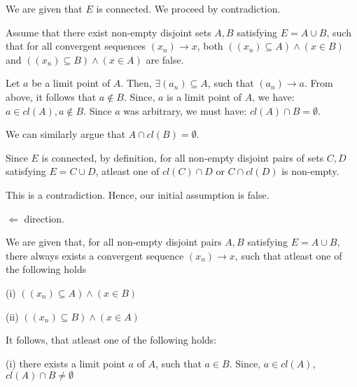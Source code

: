 \documentclass[10pt]{article}
\begin{document}
We are given that $\displaystyle E$ is connected. We proceed by contradiction.



Assume that there exist non-empty disjoint sets $\displaystyle A,B$ satisfying $\displaystyle E=A\cup B$, such that for all convergent sequences $\displaystyle ( x_{n})\rightarrow x$, both $\displaystyle (( x_{n}) \subseteq A) \land ( x\in B)$ and $\displaystyle (( x_{n}) \subseteq B) \land ( x\in A)$ are false.



Let $\displaystyle a$ be a limit point of $\displaystyle A$. Then, $\displaystyle \exists ( a_{n}) \subseteq A$, such that $\displaystyle ( a_{n})\rightarrow a$. From above, it follows that $\displaystyle a\notin B$. Since, $\displaystyle a$ is a limit point of $\displaystyle A$, we have: $\displaystyle a\in cl( A) ,a\notin B$. Since $\displaystyle a$ was arbitrary, we must have: $\displaystyle cl( A) \cap B=\emptyset $.



We can similarly argue that $\displaystyle A\cap cl( B) =\emptyset $.



Since $\displaystyle E$ is connected, by definition, for all non-empty disjoint pairs of sets $\displaystyle C,D$ satisfying $\displaystyle E=C\cup D$, atleast one of $\displaystyle cl( C) \cap D$ or $\displaystyle C\cap cl( D)$ is non-empty. 



This is a contradiction. Hence, our initial assumption is false.



$\displaystyle \Longleftarrow $ direction.



We are given that, for all non-empty disjoint pairs $\displaystyle A,B$ satisfying $\displaystyle E=A\cup B$, there always exists a convergent sequence $\displaystyle ( x_{n})\rightarrow x$, such that atleast one of the following holds

(i) $\displaystyle (( x_{n}) \subseteq A) \land ( x\in B)$

(ii) $\displaystyle (( x_{n}) \subseteq B) \land ( x\in A)$



It follows, that atleast one of the following holds:

(i) there exists a limit point $\displaystyle a$ of $\displaystyle A$, such that $\displaystyle a\in B$. Since, $\displaystyle a\in cl( A)$, $\displaystyle cl( A) \cap B\neq \emptyset $
\end{document}

